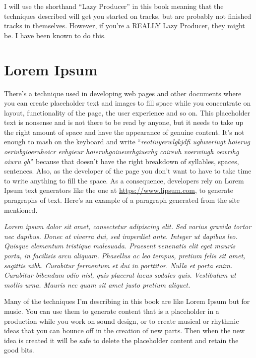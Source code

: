 \documentclass[
  12pt,
  letterpaper,
  oneside,
  open=any]{scrbook}
\begin{document}
I will use the shorthand ``Lazy Producer'' in this book meaning that the
techniques described will get you started on tracks, but are probably
not finished tracks in themselves. However, if you're a REALLY Lazy
Producer, they might be. I have been known to do this.

\section*{Lorem Ipsum}\label{lorem-ipsum}


There's a technique used in developing web pages and other documents
where you can create placeholder text and images to fill space while you
concentrate on layout, functionality of the page, the user experience
and so on. This placeholder text is nonsense and is not there to be read
by anyone, but it needs to take up the right amount of space and have
the appearance of genuine content. It's not enough to mash on the
keyboard and write ``\emph{reotiuyerwlgkjdfi ughweriugt hoierug
oeriubgioeruhoicr evhgieur hoieruhgoiuewrhgiuerhg coireuh voerwiugh
oewrihg oiwru gh}'' because that doesn't have the right breakdown of
syllables, spaces, sentences. Also, as the developer of the page you
don't want to have to take time to write anything to fill the space. As
a consequence, developers rely on Lorem Ipsum text generators like the
one at \url{https://www.lipsum.com}, to generate paragraphs of text.
Here's an example of a paragraph generated from the site mentioned.

\emph{Lorem ipsum dolor sit amet, consectetur adipiscing elit. Sed
varius gravida tortor nec dapibus. Donec at viverra dui, sed imperdiet
ante. Integer ut dapibus leo. Quisque elementum tristique malesuada.
Praesent venenatis elit eget mauris porta, in facilisis arcu aliquam.
Phasellus ac leo tempus, pretium felis sit amet, sagittis nibh.
Curabitur fermentum et dui in porttitor. Nulla et porta enim. Curabitur
bibendum odio nisl, quis placerat lacus sodales quis. Vestibulum ut
mollis urna. Mauris nec quam sit amet justo pretium aliquet.}

Many of the techniques I'm describing in this book are like Lorem Ipsum
but for music. You can use them to generate content that is a
placeholder in a production while you work on sound design, or to create
musical or rhythmic ideas that you can bounce off in the creation of new
parts. Then when the new idea is created it will be safe to delete the
placeholder content and retain the good bits.
\end{document}
